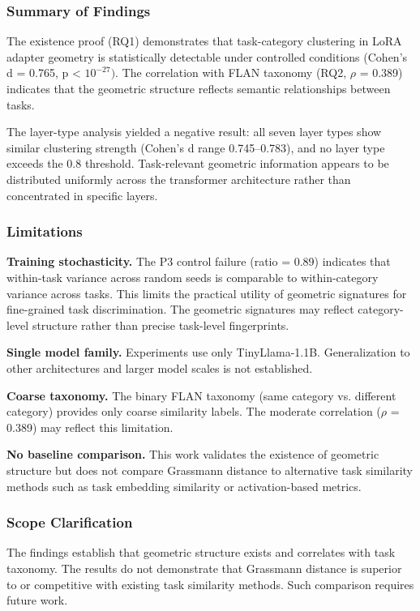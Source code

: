 
\subsubsection{Summary of Findings}

The existence proof (RQ1) demonstrates that task-category clustering in LoRA adapter geometry is statistically detectable under controlled conditions (Cohen's d = 0.765, p < $10^{-27})$. The correlation with FLAN taxonomy (RQ2, $\rho$ = 0.389) indicates that the geometric structure reflects semantic relationships between tasks.

The layer-type analysis yielded a negative result: all seven layer types show similar clustering strength (Cohen's d range 0.745--0.783), and no layer type exceeds the 0.8 threshold. Task-relevant geometric information appears to be distributed uniformly across the transformer architecture rather than concentrated in specific layers.

\subsubsection{Limitations}

\textbf{Training stochasticity.} The P3 control failure (ratio = 0.89) indicates that within-task variance across random seeds is comparable to within-category variance across tasks. This limits the practical utility of geometric signatures for fine-grained task discrimination. The geometric signatures may reflect category-level structure rather than precise task-level fingerprints.

\textbf{Single model family.} Experiments use only TinyLlama-1.1B. Generalization to other architectures and larger model scales is not established.

\textbf{Coarse taxonomy.} The binary FLAN taxonomy (same category vs. different category) provides only coarse similarity labels. The moderate correlation ($\rho$ = 0.389) may reflect this limitation.

\textbf{No baseline comparison.} This work validates the existence of geometric structure but does not compare Grassmann distance to alternative task similarity methods such as task embedding similarity or activation-based metrics.

\subsubsection{Scope Clarification}

The findings establish that geometric structure exists and correlates with task taxonomy. The results do not demonstrate that Grassmann distance is superior to or competitive with existing task similarity methods. Such comparison requires future work.
